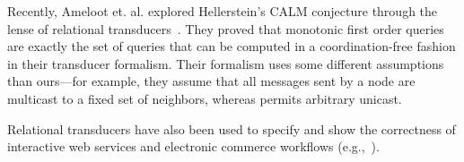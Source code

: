 Recently, Ameloot et. al. explored Hellerstein's CALM conjecture through the lense of relational transducers~\cite{relational-transducers}.  They proved that monotonic first order queries are exactly the set of queries that can be computed in a coordination-free fashion in their transducer formalism.  Their formalism uses some different assumptions than ours---for example, they assume that all messages sent by a node are multicast to a fixed set of neighbors, whereas \lang permits arbitrary unicast.

Relational transducers have also been used to specify and show the correctness
of interactive web services and electronic commerce workflows
(e.g.,~\cite{trans-ecommerce,deutsch-icdt,deutsch-web-app}).

